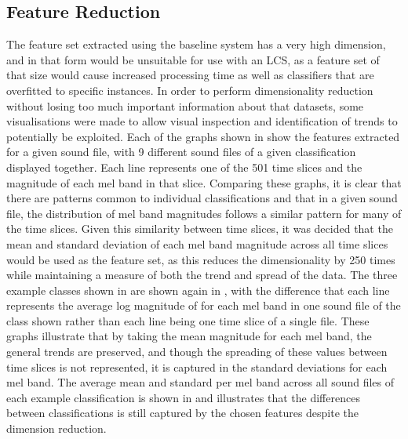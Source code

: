 \documentclass[11pt]{article}
\begin{document}
\begin{multicols}{2}
\subsection{Feature Reduction}
The feature set extracted using the baseline system has a very high dimension, and in that form would be unsuitable for use with an LCS, as a feature set of that size would cause increased processing time as well as classifiers that are overfitted to specific instances. In order to perform dimensionality reduction without losing too much important information about that datasets, some visualisations were made to allow visual inspection and identification of trends to potentially be exploited. Each of the graphs shown in 
show the features extracted for a given sound file, with 9 different sound files of a given classification displayed together. Each line represents one of the 501 time slices and the magnitude of each mel band in that slice. 
Comparing these graphs, it is clear that there are patterns common to individual classifications and that in a given sound file, the distribution of mel band magnitudes follows a similar pattern for many of the time slices. Given this similarity between time slices, it was decided that the mean and standard deviation of each mel band magnitude across all time slices would be used as the feature set, as this reduces the dimensionality by 250 times while maintaining a measure of both the trend and spread of the data. The three example classes shown in 
are shown again in 
, 
with the difference that each line represents the average log magnitude of for each mel band in one sound file of the class shown rather than each line being one time slice of a single file. These graphs illustrate that by taking the mean magnitude for each mel band, the general trends are preserved, and though the spreading of these values between time slices is not represented, it is captured in the standard deviations for each mel band. The average mean and standard per mel band across all sound files of each example classification is shown in 
 and illustrates that the differences between classifications is still captured by the chosen features despite the dimension reduction.

\end{multicols}
\end{document}

